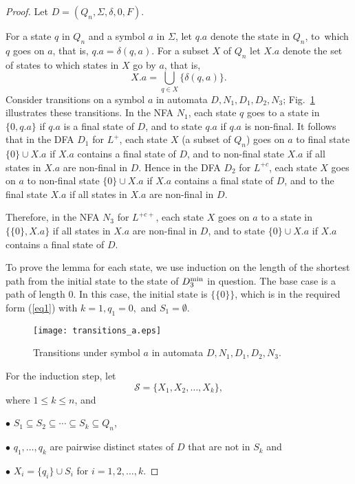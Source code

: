 \documentclass[runningheads]{llncs}
\begin{document}
\begin{proof}
 Let $D=(Q_n,\Sigma,\delta,0,F)$. 

 For a state $q$ in $Q_n$ and a symbol $a$ in $\Sigma$, 
 let $q.a$ denote the state in $Q_n$, to~which $q$ goes on $a$,
 that is, $q.a=\delta(q,a)$.
 For a subset $X$ of $Q_n$ let $X.a$ denote
 the set of states to which states in $X$ go by $a$,
 that is,
 $$
   X.a=\bigcup_{q\in X}\{\delta(q,a)\}.
 $$
 Consider transitions on a symbol $a$
 in automata $D,N_1,D_1,D_2,N_3$; 
 Fig.~\ref{fig:transitions} illustrates these transitions.
 In the NFA $N_1$,
 each state $q$ goes to a state in $\{0,q.a\}$ if $q.a$ is a final state of $D$,
 and to state  $q.a$ if $q.a$ is non-final.
 It follows that in the DFA $D_1$ for $L^+$,
 each state $X$ (a subset of $Q_n$)
 goes on $a$ to  final state $\{0\}\cup X.a$ if $X.a$ contains a final state of $D$,
 and to non-final state $X.a$ if all states in $X.a$ are non-final in $D$.
 Hence in the DFA $D_2$ for $L^{+c}$,
 each state $X$ goes on $a$ 
 to non-final state $\{0\}\cup X.a$ if $X.a$ contains a final state of $D$,
 and to the final state $X.a$ if all states in $X.a$ are non-final in $D$.

 Therefore, in the NFA $N_3$ for $L^{+c+}$,
 each state $X$ goes on $a$ to a state in
 $\{ \{0\}, X.a\}$  if all states in $X.a$ are non-final in $D$,
 and to state  $\{0\}\cup X.a$ if $X.a$ contains a final state of $D$.

 To prove the lemma for each state,
 we use induction on the length of the shortest
 path from the initial state to the state of $D_3^{\rm min}$ in question.
 The base case is a path of length $0$.  In this case,
 the initial state is $\{\{0\}\}$, 
 which is in the required form (\ref{eq1}) with
 $k=1,q_1=0,$ and $S_1=\emptyset$.

 \begin{figure}[h]\label{-----fig4}
 \centering
 \texttt{[image: transitions\_a.eps]}
 \caption{Transitions under symbol $a$ in automata $D, N_1,D_1,D_2,N_3$.}
 \label{fig:transitions}
 \end{figure}


 For the induction step, let
 $$
  \mathcal{S}=\{X_1,X_2,\ldots,X_k\},
 $$ 
 where $1\le k\le n$, and

 $\bullet$  $S_1\subseteq S_2\subseteq \cdots  \subseteq S_k\subseteq Q_n$,

 $\bullet$  $q_1,\ldots,q_k$ are pairwise distinct states of $D$
            that are not in $S_k$ and

 $\bullet$ $X_i=\{q_i\}\cup S_i$  for $i=1,2,\ldots,k$.


\end{proof}
\end{document}
